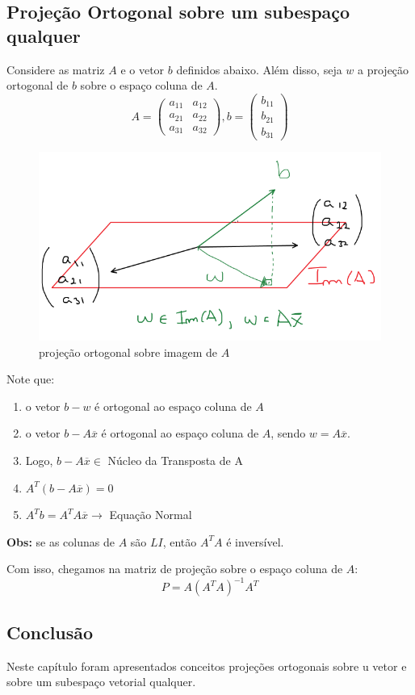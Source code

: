 \documentclass[12pt]{article}
\begin{document}
\subsection{Projeção Ortogonal sobre um subespaço qualquer}
Considere as matriz $A$ e o vetor $b$ definidos abaixo. Além disso, seja $w$ a projeção ortogonal de $b$ sobre o espaço coluna de $A$.
\begin{equation*}
	A=\begin{pmatrix}
		a_{11} & a_{12} \\
		a_{21} & a_{22}\\
		a_{31} & a_{32} 
	\end{pmatrix},b=\begin{pmatrix}
		b_{11} \\
		b_{21} \\
		b_{31}
	\end{pmatrix}	
\end{equation*}

\begin{figure}[H]
	\centering
	\includegraphics[width=0.4\linewidth]{Imagens/projOrtogEsp}
	\caption{projeção ortogonal sobre imagem de $A$}
	\label{fig:projortogesp}
\end{figure}


Note que:
\begin{enumerate}
	\item o vetor $b-w$ é ortogonal ao espaço coluna de $A$
	\item o vetor $b-A\overline{x}$ é ortogonal ao espaço coluna de $A$, sendo $w=A\overline{x}$.
	\item Logo, $b-A\overline{x}\in $ Núcleo da Transposta de A
	\item $A^T(b-A\overline{x})=0$
	\item $A^Tb=A^TA\overline{x} \rightarrow$ Equação Normal
\end{enumerate}
\textbf{Obs:} se as colunas de $A$ são $LI$, então $A^TA$ é inversível.

Com isso, chegamos na matriz de projeção sobre o espaço coluna de $A$:
\begin{equation*}
	P=A\left(A^TA\right)^{-1}A^T
\end{equation*}
\subsection{Conclusão}
Neste capítulo foram apresentados conceitos projeções ortogonais sobre u vetor e sobre um subespaço vetorial qualquer.
\end{document}
